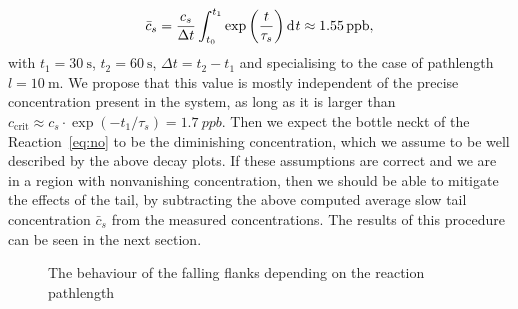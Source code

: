 \begin{align}
  \bar c_s = \frac{c_s}{\Delta t} \int_{t_0}^{t_1}
  \exp\left(\frac{t}{\tau_s}\right)\d[t] \approx \SI{1.55}{ppb},\label{eq:offset}
\end{align}
with $t_1 = \SI{30}{\second}$, $t_2 = \SI{60}{\second}$, $\Delta t =
t_2 - t_1$ and specialising to the case of pathlength $l =
\SI{10}{\meter}$. We propose that this value is mostly independent of
the precise  concentration present in the system, as long as it
is larger than $c_{\text{crit}} \approx c_s\cdot \exp(-t_1/\tau_s) =
\SI{1.7}{ppb}$. Then we expect the bottle neckt of the
Reaction~\eqref{eq:no} to be the diminishing  concentration,
which we assume to be well described by the above decay plots. If
these assumptions are correct and we are in a region with nonvanishing
 concentration, then we should be able to mitigate the effects
of the tail, by subtracting the above computed average slow tail
concentration $\bar c_s$ from the measured 
concentrations. The results of this procedure can be seen in the next
section.
\begin{figure}[htbp]
  \centering
  
  \caption{The behaviour of the falling flanks depending on the
    reaction pathlength}
  \label{fig:switch-pl}
\end{figure}


